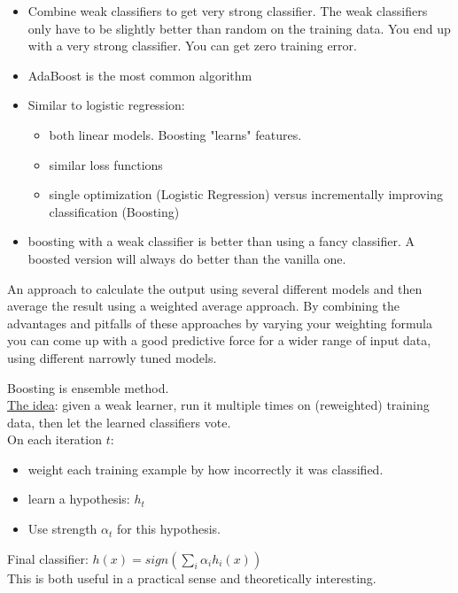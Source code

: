 \begin{itemize}
	\item Combine	weak	classifiers	to get very strong classifier.  
		The weak classifiers only have to be slightly better than random on the training data. 
		You end up with a very strong classifier.  You can get zero training error. 
	\item AdaBoost is the most common algorithm
	\item Similar to logistic regression:
		\begin{itemize}
			\item both linear models.  Boosting "learns" features.  
			\item similar loss functions
			\item single optimization (Logistic Regression) versus incrementally improving classification (Boosting) 
		\end{itemize}
	\item  boosting with a weak classifier is better than using a fancy classifier. 
		A boosted version will always do better than the vanilla one. 
\end{itemize}


An approach to calculate the output using several different models and then average the result using a weighted average approach. 
By combining the advantages and pitfalls of these approaches by varying your weighting formula you can come up with a good predictive force for a wider range of input data, using different narrowly tuned models.  %

Boosting is ensemble method. \hfill \\
\underline{The idea}: given a weak learner, run it multiple times on (reweighted) training data, 
	then let the learned classifiers vote.  \hfill \\
	
On each iteration $t$:
\begin{itemize}
	\item weight each training example by how incorrectly it was classified.
	\item learn a hypothesis: $h_t$
	\item Use strength $\alpha_t$ for this hypothesis. 
\end{itemize}
Final classifier: $\displaystyle h(x) = sign \left( \sum_i \alpha_i h_i(x)  \right)$ \hfill \\
This is both useful in a practical sense and theoretically interesting. 

